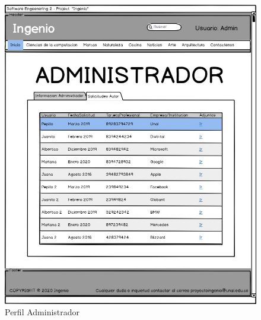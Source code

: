 \documentclass[a4paper,12 pt]{article}
\begin{document}
\begin{figure}[H]
    \centering
    \includegraphics[scale = 0.7]{images/PerfilAdministrador.jpg}
    \caption{Perfil Administrador}
    \label{F109}
\end{figure}{}
\end{document}
